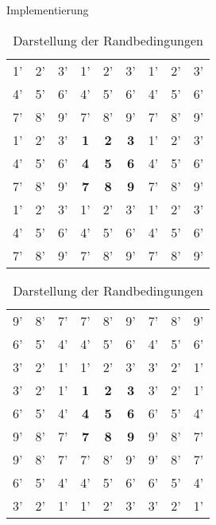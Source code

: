 \documentclass[runningheads]{llncs}
\begin{document}
\begin{section}{Implementierung}
            \begin{table}
                \centering
                \caption{Darstellung der Randbedingungen}
                \label{randbedingungen}
                \begin{tabular}{ | c c c | c c c | c c c | }
                    \hline
                    1' & 2' & 3' & 1' & 2' & 3' & 1' & 2' & 3' \\
                    4' & 5' & 6' & 4' & 5' & 6' & 4' & 5' & 6' \\
                    7' & 8' & 9' & 7' & 8' & 9' & 7' & 8' & 9' \\
                    \hline
                    1' & 2' & 3' & \textbf{1}  & \textbf{2}  & \textbf{3}  & 1' & 2' & 3' \\
                    4' & 5' & 6' & \textbf{4}  & \textbf{5}  & \textbf{6}  & 4' & 5' & 6' \\
                    7' & 8' & 9' & \textbf{7}  & \textbf{8}  & \textbf{9}  & 7' & 8' & 9' \\
                    \hline
                    1' & 2' & 3' & 1' & 2' & 3' & 1' & 2' & 3' \\
                    4' & 5' & 6' & 4' & 5' & 6' & 4' & 5' & 6' \\
                    7' & 8' & 9' & 7' & 8' & 9' & 7' & 8' & 9' \\
                    \hline
                \end{tabular}
                \begin{tabular}{ | c c c | c c c | c c c | }
                    \hline
                    9' & 8' & 7' & 7' & 8' & 9' & 7' & 8' & 9' \\
                    6' & 5' & 4' & 4' & 5' & 6' & 4' & 5' & 6' \\
                    3' & 2' & 1' & 1' & 2' & 3' & 3' & 2' & 1' \\
                    \hline
                    3' & 2' & 1' & \textbf{1}  & \textbf{2}  & \textbf{3}  & 3' & 2' & 1' \\
                    6' & 5' & 4' & \textbf{4}  & \textbf{5}  & \textbf{6}  & 6' & 5' & 4' \\
                    9' & 8' & 7' & \textbf{7}  & \textbf{8}  & \textbf{9}  & 9' & 8' & 7' \\
                    \hline
                    9' & 8' & 7' & 7' & 8' & 9' & 9' & 8' & 7' \\
                    6' & 5' & 4' & 4' & 5' & 6' & 6' & 5' & 4' \\
                    3' & 2' & 1' & 1' & 2' & 3' & 3' & 2' & 1' \\
                    \hline
                \end{tabular}
            \end{table}


\end{section}
\end{document}
